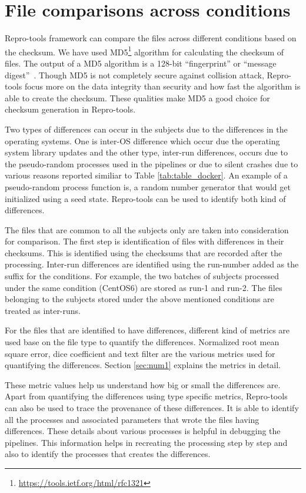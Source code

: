 \section{File comparisons across conditions}
Repro-tools framework can compare the files across different conditions based on the checksum. We have used MD5\footnote{\url{https://tools.ietf.org/html/rfc1321}} algorithm for calculating the checksum of files. The output of a MD5 algorithm is a 128-bit ``fingerprint'' or ``message digest''~\cite{md5}. Though MD5 is not completely secure against collision attack, Repro-tools focus more on the data integrity than security and how fast the algorithm is able to create the checksum. These qualities make MD5 a good choice for checksum generation in Repro-tools.

Two types of differences can occur in the subjects due to the differences in the operating systems. One is inter-OS difference which occur due the operating system library updates and the other type, inter-run differences, occurs due to the pseudo-random processes used in the pipelines or due to silent crashes due to various reasons reported similiar to Table \ref{tab:table_docker}. An example of a pseudo-random process function is, a random number generator that would get initialized using a seed state. Repro-tools can be used to identify both kind of differences.

The files that are common to all the subjects only are taken into consideration for comparison. The first step is identification of files with differences in their checksums. This is identified using the checksums that are recorded after the processing. Inter-run differences are identified using the run-number added as the suffix for the conditions. For example, the two batches of subjects processed under the same condition (CentOS6) are stored as run-1 and run-2. The files belonging to the subjects stored under the above mentioned conditions are treated as inter-runs.

For the files that are identified to have differences, different kind of metrics are used base on the file type to quantify the differences. Normalized root mean square error, dice coefficient and text filter are the various metrics used for quantifying the differences. Section \ref{sec:num1} explains the metrics in detail. 

These metric values help us understand how big or small the differences are. Apart from quantifying the differences using type specific metrics, Repro-tools can also be used to trace the provenance of these differences. It is able to identify all the processes and associated parameters that wrote the files having differences. These details about various processes is helpful in debugging the pipelines. This information helps in recreating the processing step by step and also to identify the processes that creates the differences.

